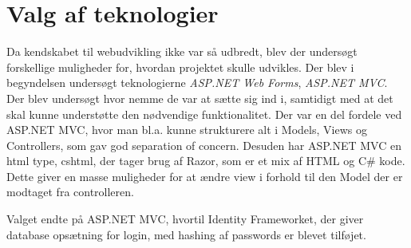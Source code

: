 \section{Valg af teknologier}
Da kendskabet til webudvikling ikke var så udbredt, blev der undersøgt forskellige muligheder for, hvordan projektet skulle udvikles. Der blev i begyndelsen undersøgt teknologierne \textit{ASP.NET Web Forms}, \textit{ASP.NET MVC}. Der blev undersøgt hvor nemme de var at sætte sig ind i, samtidigt med at det skal kunne understøtte den nødvendige funktionalitet. Der var en del fordele ved ASP.NET MVC, hvor man bl.a. kunne strukturere alt i Models, Views og Controllers, som gav god separation of concern. Desuden har ASP.NET MVC en html type, cshtml, der tager brug af Razor, som er et mix af HTML og C\# kode. Dette giver en masse muligheder for at ændre view i forhold til den Model der er modtaget fra controlleren. 

\noindent Valget endte på ASP.NET MVC, hvortil Identity Frameworket, der giver database opsætning for login, med hashing af passwords er blevet tilføjet. 